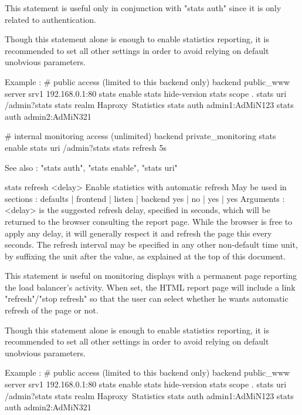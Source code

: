   This statement is useful only in conjunction with "stats auth" since it is
  only related to authentication.

  Though this statement alone is enough to enable statistics reporting, it is
  recommended to set all other settings in order to avoid relying on default
  unobvious parameters.

  Example :
    # public access (limited to this backend only)
    backend public_www
        server srv1 192.168.0.1:80
        stats enable
        stats hide-version
        stats scope   .
        stats uri     /admin?stats
        stats realm   Haproxy\ Statistics
        stats auth    admin1:AdMiN123
        stats auth    admin2:AdMiN321

    # internal monitoring access (unlimited)
    backend private_monitoring
        stats enable
        stats uri     /admin?stats
        stats refresh 5s

  See also : "stats auth", "stats enable", "stats uri"


stats refresh <delay>
  Enable statistics with automatic refresh
  May be used in sections :   defaults | frontend | listen | backend
                                 yes   |    no    |   yes  |   yes
  Arguments :
    <delay>   is the suggested refresh delay, specified in seconds, which will
              be returned to the browser consulting the report page. While the
              browser is free to apply any delay, it will generally respect it
              and refresh the page this every seconds. The refresh interval may
              be specified in any other non-default time unit, by suffixing the
              unit after the value, as explained at the top of this document.

  This statement is useful on monitoring displays with a permanent page
  reporting the load balancer's activity. When set, the HTML report page will
  include a link "refresh"/"stop refresh" so that the user can select whether
  he wants automatic refresh of the page or not.

  Though this statement alone is enough to enable statistics reporting, it is
  recommended to set all other settings in order to avoid relying on default
  unobvious parameters.

  Example :
    # public access (limited to this backend only)
    backend public_www
        server srv1 192.168.0.1:80
        stats enable
        stats hide-version
        stats scope   .
        stats uri     /admin?stats
        stats realm   Haproxy\ Statistics
        stats auth    admin1:AdMiN123
        stats auth    admin2:AdMiN321

